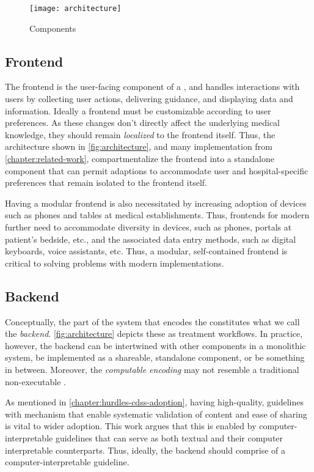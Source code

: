 \begin{figure}[t]
\centering
\texttt{[image: architecture]}
\caption{\CDSSs{} Components}\label{fig:architecture}
\end{figure}


\subsection{Frontend}\label{sec:frontend}

The frontend is the user-facing component of a \CDSS{}, and
handles interactions with users by collecting user actions,
delivering guidance, and displaying data and information.
Ideally a \CDSS{} frontend must be customizable according to
user preferences. As these changes don't directly
affect the underlying medical knowledge, they should remain
\emph{localized} to the frontend itself.
Thus, the architecture shown in \autoref{fig:architecture},
and many implementation from \autoref{chapter:related-work},
compartmentalize the frontend into a standalone component that
can permit adaptions to accommodate user and hospital-specific
preferences that remain isolated to the frontend itself.

Having a modular frontend is also necessitated by increasing
adoption of devices such as phones and tables at medical establishments.
Thus, frontends for modern \CDSSs{} further need to accommodate
diversity in devices, such as phones, portals at patient's bedside, etc.,
and the associated data entry methods, such as digital keyboards, voice
assistants, etc. Thus, a modular, self-contained frontend is
critical to solving problems with modern \CDSS{} implementations.

\subsection{Backend}\label{sec:backend}

Conceptually, the part of the system that encodes the \BPG{}
constitutes what we call the \emph{backend}. \autoref{fig:architecture}
depicts these as treatment workflows.
In practice, however, the backend can be intertwined with other components in a
monolithic system, be implemented as a shareable,
standalone component, or be something in between. Moreover,
the \emph{computable encoding} may not resemble a traditional
non-executable \BPG{}.

As mentioned in \autoref{chapter:hurdles-cdss-adoption}, having
high-quality, guidelines with mechanism that enable systematic
validation of content and ease of sharing is vital to wider
adoption. This work argues that this is enabled by computer-interpretable guidelines that can serve as
both textual \BPGs{} and their computer interpretable counterparts. Thus,
ideally, the backend should comprise of a computer-interpretable guideline.


